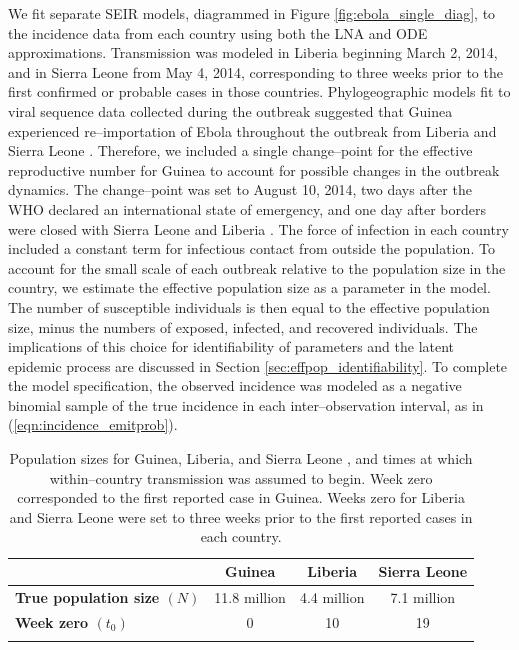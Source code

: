 We fit separate SEIR models, diagrammed in Figure \ref{fig:ebola_single_diag}, to the incidence data from each country using both the LNA and ODE approximations. Transmission was modeled in Liberia beginning March 2, 2014, and in Sierra Leone from May 4, 2014, corresponding to three weeks prior to the first confirmed or probable cases in those countries. Phylogeographic models fit to viral sequence data collected during the outbreak suggested that Guinea experienced re--importation of Ebola throughout the outbreak from Liberia and Sierra Leone \cite{dudas2017virus}. Therefore, we included a single change--point for the effective reproductive number for Guinea to account for possible changes in the outbreak dynamics. The change--point was set to August 10, 2014, two days after the WHO declared an international state of emergency, and one day after borders were closed with Sierra Leone and Liberia \cite{coltart2017ebola}. The force of infection in each country included a constant term for infectious contact from outside the population. To account for the small scale of each outbreak relative to the population size in the country, we estimate the effective population size as a parameter in the model. The number of susceptible individuals is then equal to the effective population size, minus the numbers of exposed, infected, and recovered individuals. The implications of this choice for identifiability of parameters and the latent epidemic process are discussed in Section \ref{sec:effpop_identifiability}. To complete the model specification, the observed incidence was modeled as a negative binomial sample of the true incidence in each inter--observation interval, as in (\ref{eqn:incidence_emitprob}).

\begin{table}[htbp]
	\caption[Population sizes for Guinea, Liberia, and Sierra Leone, along with times at which transmission was assumed to begin.]{Population sizes for Guinea, Liberia, and Sierra Leone \cite{un2017popdat}, and times at which within--country transmission was assumed to begin. Week zero corresponded to the first reported case in Guinea. Weeks zero for Liberia and Sierra Leone were set to three weeks prior to the first reported cases in each country.}
	\label{tab:ebola_pops_t0}
	\footnotesize
	\centering
	\begin{tabular}{lccc}	
		\hline	
		& \textbf{Guinea} & \textbf{Liberia} & \textbf{Sierra Leone} \\\hline
		\textbf{True population size $ (N)$} & 11.8 million & 4.4 million & 7.1 million \\ 
		\textbf{Week zero $ (t_0) $} & 0 & 10 & 19 \\
		\hline
		&&&
	\end{tabular} 
\end{table}

